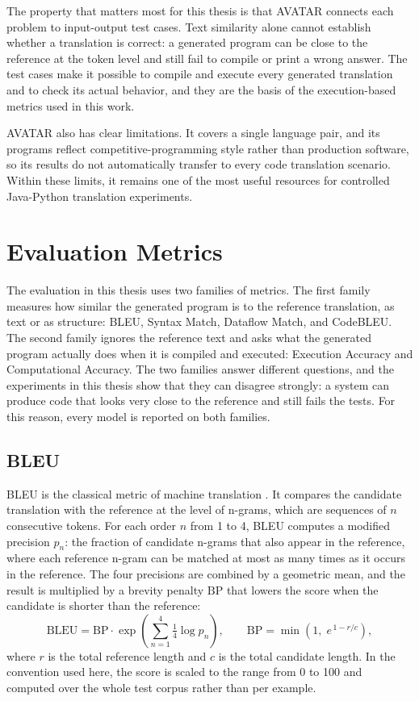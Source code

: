 The property that matters most for this thesis is that AVATAR connects each
problem to input-output test cases. Text similarity alone cannot establish
whether a translation is correct: a generated program can be close to the
reference at the token level and still fail to compile or print a wrong
answer. The test cases make it possible to compile and execute every generated
translation and to check its actual behavior, and they are the basis of the
execution-based metrics used in this work.

AVATAR also has clear limitations. It covers a single language pair, and its
programs reflect competitive-programming style rather than production
software, so its results do not automatically transfer to every code
translation scenario. Within these limits, it remains one of the most useful
resources for controlled Java-Python translation experiments.

\section{Evaluation Metrics}

\quad The evaluation in this thesis uses two families of metrics. The first
family measures how similar the generated program is to the reference
translation, as text or as structure: BLEU, Syntax Match, Dataflow Match, and
CodeBLEU. The second family ignores the reference text and asks what the
generated program actually does when it is compiled and executed: Execution
Accuracy and Computational Accuracy. The two families answer different
questions, and the experiments in this thesis show that they can disagree
strongly: a system can produce code that looks very close to the reference and
still fails the tests. For this reason, every model is reported on both
families.

\subsection{BLEU}

\quad BLEU is the classical metric of machine translation
\cite{papineni2002bleu}. It compares the candidate translation with the
reference at the level of n-grams, which are sequences of $n$ consecutive
tokens. For each order $n$ from 1 to 4, BLEU computes a modified precision
$p_n$: the fraction of candidate n-grams that also appear in the reference,
where each reference n-gram can be matched at most as many times as it occurs
in the reference. The four precisions are combined by a geometric mean, and
the result is multiplied by a brevity penalty $\mathrm{BP}$ that lowers the
score when the candidate is shorter than the reference:
\[
\text{BLEU} = \mathrm{BP} \cdot \exp\left(\sum_{n=1}^{4} \tfrac{1}{4} \log p_n\right),
\qquad
\mathrm{BP} = \min\left(1,\; e^{\,1 - r/c}\right),
\]
where $r$ is the total reference length and $c$ is the total candidate length.
In the convention used here, the score is scaled to the range from 0 to 100
and computed over the whole test corpus rather than per example.

